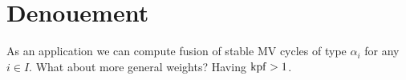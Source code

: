 \documentclass[draft]{article}
\begin{document}
\begin{comment}
\begin{lemma}%
    Let $\mu_1,\mu_2$ be dominant and let $s\in \AA^1 - \{0\}$. Then 
    \begin{equation}
        S_{\mu_1,\mu_2}^s \subset \cW_\mu 
    \end{equation}
    where $\mu = \mu_1 + \mu_2$.
\end{lemma}

\begin{proof}
    We have
\[
\begin{split}
    S_{\mu_1, \mu_2} & = N\xT[t^{-1}]t^{\mu_1}(t-s)^{\mu_2} \\
     & \subset T_1\xt[t^{-1}] N\xT[t^{-1}] t^{\mu_1} (t-s)^{\mu_2} \\
     & = T_1\xt[t^{-1}] N_1\xt[t^{-1}] t^{\mu_1} (t-s)^{\mu_2} \qquad \text{\cite[Lemma 2.3]{kamnitzer2014yangians}}\\
     & = B_1\xt[t^{-1}] t^{\mu_1} (t-s)^{\mu_2} \\
     & = B_1\xt[t^{-1}] t^{\mu_1 + \mu_2} \\
     & \subset G_1\xt[t^{-1}] t^{\mu_1 + \mu_2} \\
     & = W_{\mu_1 + \mu_2}
\end{split}
\]
where $B_1\xt[t^{-1}] t^{\mu_1} (t-s)^{\mu_2} = B_1\xt[t^{-1}] t^{\mu_1 + \mu_2}$ since 
\[
\frac{t}{t-s} = 
1 + \frac{s}{t} + \frac{s^2}{t^2} + \cdots 
\in B_1\xt[t^{-1}].
\]
\end{proof}
\end{comment}

\section{Denouement}
\label{s:denouement}

As an application we can compute fusion of stable MV cycles of type $\alpha_i$ for any $i \in I$. What about more general weights? Having $\operatorname{kpf} > 1$.
\end{document}
